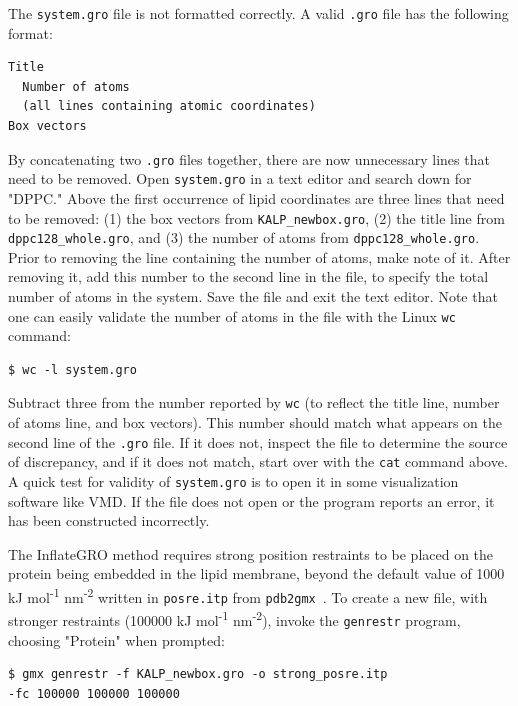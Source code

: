 \documentclass[9pt,tutorial]{livecoms}
\begin{document}
The \texttt{system.gro} file is not formatted correctly. A valid \texttt{.gro} file has the following format:

\begin{verbatim}
Title
  Number of atoms
  (all lines containing atomic coordinates)
Box vectors
\end{verbatim}

By concatenating two \texttt{.gro} files together, there are now unnecessary lines that need to be removed. Open \texttt{system.gro} in a text editor and search down for "DPPC." Above the first occurrence of lipid coordinates are three lines that need to be removed: (1) the box vectors from \texttt{KALP\_newbox.gro}, (2) the title line from \texttt{dppc128\_whole.gro}, and (3) the number of atoms from \texttt{dppc128\_whole.gro}. Prior to removing the line containing the number of atoms, make note of it. After removing it, add this number to the second line in the file, to specify the total number of atoms in the system. Save the file and exit the text editor. Note that one can easily validate the number of atoms in the file with the Linux \texttt{wc} command:

\begin{verbatim}
$ wc -l system.gro
\end{verbatim}

Subtract three from the number reported by \texttt{wc} (to reflect the title line, number of atoms line, and box vectors). This number should match what appears on the second line of the \texttt{.gro} file. If it does not, inspect the file to determine the source of discrepancy, and if it does not match, start over with the \texttt{cat} command above. A quick test for validity of \texttt{system.gro} is to open it in some visualization software like VMD. If the file does not open or the program reports an error, it has been constructed incorrectly.

The InflateGRO method requires strong position restraints to be placed on the protein being embedded in the lipid membrane, beyond the default value of 1000 kJ mol\textsuperscript{-1} nm\textsuperscript{-2} written in \texttt{posre.itp} from \texttt{pdb2gmx}~\cite{Kandt2007}. To create a new file, with stronger restraints (100000 kJ mol\textsuperscript{-1} nm\textsuperscript{-2}), invoke the \texttt{genrestr} program, choosing "Protein" when prompted:

\begin{verbatim}
$ gmx genrestr -f KALP_newbox.gro -o strong_posre.itp 
-fc 100000 100000 100000
\end{verbatim}
\end{document}
